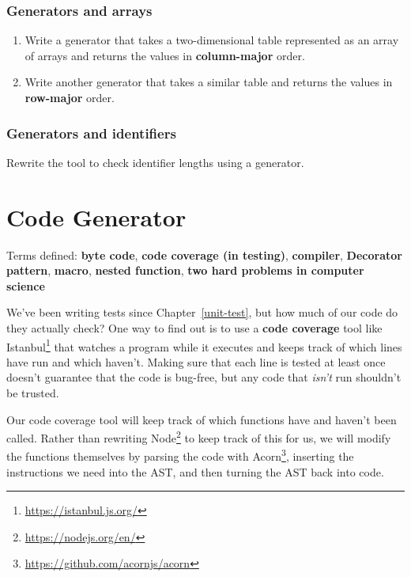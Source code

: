 \documentclass[krantzl]{krantz}
\newcommand{\chapref}[1]{Chapter~\ref{#1}}
\newcommand{\glossref}[1]{\textbf{#1}}
\newcommand{\hreffoot}[2]{{#1}\footnote{\href{#2}{#2}}}
\begin{document}
\subsection*{Generators and arrays}

\begin{enumerate}

\item 

Write a generator that takes a two-dimensional table represented as an array of arrays
    and returns the values in \glossref{column-major} order.



\item 

Write another generator that takes a similar table
    and returns the values in \glossref{row-major} order.



\end{enumerate}

\subsection*{Generators and identifiers}


Rewrite the tool to check identifier lengths using a generator.

\chapter{Code Generator}\label{code-generator}


\noindent 
  Terms defined: \glossref{byte code}, \glossref{code coverage (in testing)}, \glossref{compiler}, \glossref{Decorator pattern}, \glossref{macro}, \glossref{nested function}, \glossref{two hard problems in computer science}



We’ve been writing tests since \chapref{unit-test},
but how much of our code do they actually check?
One way to find out is to use a \glossref{code coverage} tool
like \hreffoot{Istanbul}{https://istanbul.js.org/}
that watches a program while it executes
and keeps track of which lines have run and which haven’t.
Making sure that each line is tested at least once doesn’t guarantee that the code is bug-free,
but any code that \emph{isn’t} run shouldn’t be trusted.


Our code coverage tool will keep track of which functions have and haven’t been called.
Rather than rewriting \hreffoot{Node}{https://nodejs.org/en/} to keep track of this for us,
we will modify the functions themselves
by parsing the code with \hreffoot{Acorn}{https://github.com/acornjs/acorn},
inserting the instructions we need into the AST,
and then turning the AST back into code.
\end{document}
